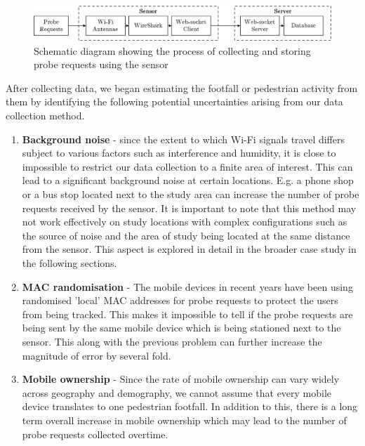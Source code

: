 \begin{figure} 
	\centering \includegraphics[width=\linewidth]
		{images/datacollection_schematic.jpeg}
	\caption 
		{Schematic diagram showing the process of collecting and storing probe
		requests using the sensor}
	\label{datacollection_schematic} 
\end{figure}

After collecting data, we began estimating the footfall or pedestrian
activity from them by identifying the following potential uncertainties arising
from our data collection method. 

\begin{enumerate} 
\item 
\textbf{Background noise} - since the extent to which Wi-Fi signals travel
		differs subject to various factors such as interference and humidity, it
		is close to impossible to restrict our data collection to a finite area
		of interest. This can lead to a significant background noise at certain
		locations. E.g. a phone shop or a bus stop located next to the study
		area can increase the number of probe requests received by the sensor.
		It is important to note that this method may not work effectively on
		study locations with complex configurations such as the source of noise
		and the area of study being located at the same distance from the
		sensor. This aspect is explored in detail in the broader case study in
		the following sections.
\item 
\textbf{MAC randomisation} - The mobile devices in recent years have been using
		randomised 'local' MAC addresses for probe requests to protect the users
		from being tracked. This makes it impossible to tell if the probe
		requests are being sent by the same mobile device which is being
		stationed next to the sensor. This along with the previous problem can
		further increase the magnitude of error by several fold.
\item
\textbf{Mobile ownership} - Since the rate of mobile ownership can vary widely
		across geography and demography, we cannot assume that every mobile
		device translates to one pedestrian footfall. In addition to this, there
		is a long term overall increase in mobile ownership which may lead to
		the number of probe requests collected overtime.
\end{enumerate}


